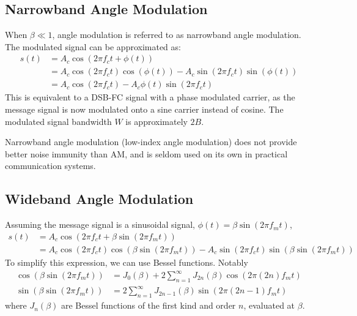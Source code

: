 \documentclass{article}
\begin{document}
\subsection{Narrowband Angle Modulation}
When \(\beta \ll 1\), angle modulation is referred to as narrowband angle modulation.
The modulated signal can be approximated as:
\begin{align*}
    s\left( t \right) & = A_c \cos{\left( 2 \pi f_c t + \phi\left( t \right) \right)}                                                                                                     \\
                      & = A_c \cos{\left( 2 \pi f_c t \right)} \cos{\left( \phi\left( t \right) \right)} - A_c \sin{\left( 2 \pi f_c t \right)} \sin{\left( \phi\left( t \right) \right)} \\
                      & = A_c \cos{\left( 2 \pi f_c t \right)} - A_c \phi\left( t \right) \sin{\left( 2 \pi f_c t \right)}
\end{align*}
This is equivalent to a DSB-FC signal with a phase modulated carrier, as the message signal is now modulated onto a sine carrier instead of cosine.
The modulated signal bandwidth \(W\) is approximately \(2B\).

Narrowband angle modulation (low-index angle modulation) does not provide better noise immunity than AM, and is
seldom used on its own in practical communication systems.
\subsection{Wideband Angle Modulation}
Assuming the message signal is a sinusoidal signal, \(\phi\left( t \right) = \beta \sin{\left( 2 \pi f_m t \right)}\),
\begin{align*}
    s\left( t \right) & = A_c \cos{\left( 2 \pi f_c t + \beta \sin{\left( 2 \pi f_m t \right)} \right)}                                                                                                                       \\
                      & = A_c \cos{\left( 2 \pi f_c t \right)} \cos{\left( \beta \sin{\left( 2 \pi f_m t \right)} \right)} - A_c \sin{\left( 2 \pi f_c t \right)} \sin{\left( \beta \sin{\left( 2 \pi f_m t \right)} \right)}
\end{align*}
To simplify this expression, we can use Bessel functions. Notably
\begin{align*}
    \cos{\left( \beta \sin{\left( 2 \pi f_m t \right)} \right)} & = J_0\left( \beta \right) + 2 \sum_{n=1}^{\infty} J_{2n}\left( \beta \right) \cos{\left( 2 \pi \left( 2n \right) f_m t \right)} \\
    \sin{\left( \beta \sin{\left( 2 \pi f_m t \right)} \right)} & = 2 \sum_{n=1}^{\infty} J_{2n-1}\left( \beta \right) \sin{\left( 2 \pi \left( 2n-1 \right) f_m t \right)}
\end{align*}
where \(J_n\left( \beta \right)\) are Bessel functions of the first kind and order \(n\), evaluated at \(\beta\).
\end{document}
